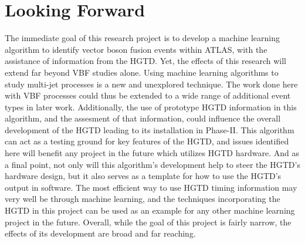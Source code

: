 \documentclass[paper=a4,fontsize=12pt]{article}
\begin{document}
\section*{Looking Forward}
    The immediate goal of this research project is to develop a machine learning algorithm to identify vector boson fusion events within ATLAS, with the assistance of information from the HGTD. Yet, the effects of this research will extend far beyond VBF studies alone. Using machine learning algorithms to study multi-jet processes is a new and unexplored technique. The work done here with VBF processes could thus be extended to a wide range of additional event types in later work. Additionally, the use of prototype HGTD information in this algorithm, and the assesment of that information, could influence the overall development of the HGTD leading to its installation in Phase-II. This algorithm can act as a testing ground for key features of the HGTD, and issues identified here will benefit any project in the future which utilizes HGTD hardware. And as a final point, not only will this algorithm's development help to steer the HGTD's hardware design, but it also serves as a template for how to use the HGTD's output in software. The most efficient way to use HGTD timing information may very well be through machine learning, and the techniques incorporating the HGTD in this project can be used as an example for any other machine learning project in the future. Overall, while the goal of this project is fairly narrow, the effects of its development are broad and far reaching.
\end{document}
